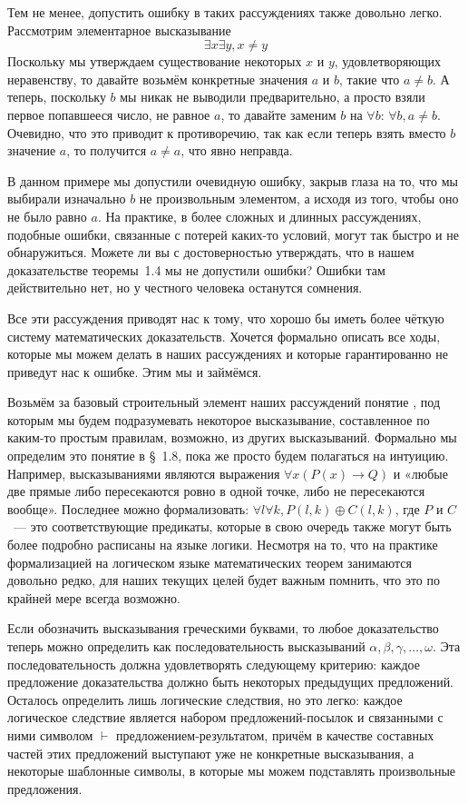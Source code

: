 Тем не менее, допустить ошибку в таких рассуждениях также довольно легко. Рассмотрим элементарное высказывание $$\exists x \exists y, x\not= y$$
Поскольку мы утверждаем существование некоторых $x$ и $y$, удовлетворяющих неравенству, то давайте возьмём конкретные значения $a$ и $b$, такие что $a\not= b$. А теперь, поскольку $b$ мы никак не выводили предварительно, а просто взяли первое попавшееся число, не равное $a$, то давайте заменим $b$ на $\forall b$: $\forall b, a\not= b$. Очевидно, что это приводит к противоречию, так как если теперь взять вместо $b$ значение $a$, то получится $a\not= a$, что явно неправда.

В данном примере мы допустили очевидную ошибку, закрыв глаза на то, что мы выбирали изначально $b$ не произвольным элементом, а исходя из того, чтобы оно не было равно $a$. На практике, в более сложных и длинных рассуждениях, подобные ошибки, связанные с потерей каких-то условий, могут так быстро и не обнаружиться. Можете ли вы с достоверностью утверждать, что в нашем доказательстве теоремы~1.4 мы не допустили ошибки? Ошибки там действительно нет, но у честного человека останутся сомнения.

Все эти рассуждения приводят нас к тому, что хорошо бы иметь более чёткую систему математических доказательств. Хочется формально описать все ходы, которые мы можем делать в наших рассуждениях и которые гарантированно не приведут нас к ошибке. Этим мы и займёмся.

Возьмём за базовый строительный элемент наших рассуждений понятие , под которым мы будем подразумевать некоторое высказывание, составленное по каким-то простым правилам, возможно, из других высказываний. Формально мы определим это понятие в \S~1.8, пока же просто будем полагаться на интуицию. Например, высказываниями являются выражения $\forall x (P(x)\to Q)$ и «любые две прямые либо пересекаются ровно в одной точке, либо не пересекаются вообще». Последнее можно формализовать: $\forall l \forall k, P(l, k) \oplus C(l, k)$, где $P$ и $C$~— это соответствующие предикаты, которые в свою очередь также могут быть более подробно расписаны на языке логики. Несмотря на то, что на практике формализацией на логическом языке математических теорем занимаются довольно редко, для наших текущих целей будет важным помнить, что это по крайней мере всегда возможно.

Если обозначить высказывания греческими буквами, то любое доказательство теперь можно определить как последовательность высказываний $\alpha, \beta, \gamma, \ldots, \omega$. Эта последовательность должна удовлетворять следующему критерию: каждое предложение доказательства должно быть  некоторых предыдущих предложений. Осталось определить лишь логические следствия, но это легко: каждое логическое следствие является набором предложений-посылок и связанными с ними символом $\vdash$ предложением-результатом, причём в качестве составных частей этих предложений выступают уже не конкретные высказывания, а некоторые шаблонные символы, в которые мы можем подставлять произвольные предложения.

